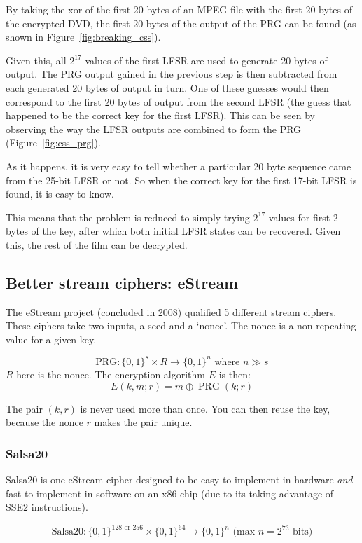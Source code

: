 \documentclass[10pt,a4paper]{report}
\begin{document}
By taking the xor of the first 20 bytes of an MPEG file with the first 20 bytes of the encrypted
DVD, the first 20 bytes of the output of the PRG can be found (as shown in
Figure~\ref{fig:breaking_css}).

Given this, all $2^{17}$ values of the first LFSR are used to generate 20 bytes of output.
The PRG output gained in the previous step is then subtracted from each generated 20 bytes of
output in turn. One of these guesses would then correspond to the first 20 bytes of output from the
second LFSR (the guess that happened to be the correct key for the first LFSR). This can be seen by
observing the way the LFSR outputs are combined to form the PRG (Figure~\ref{fig:css_prg}).

As it happens, it is very easy to tell whether a particular 20 byte sequence came from the 25-bit
LFSR or not. So when the correct key for the first 17-bit LFSR is found, it is easy to know.

This means that the problem is reduced to simply trying $2^{17}$ values for first 2 bytes of the
key, after which both initial LFSR states can be recovered. Given this, the rest of the film can be
decrypted.

\subsection{Better stream ciphers: eStream}

The eStream project (concluded in 2008) qualified 5 different stream ciphers. These ciphers take
two inputs, a seed and a `nonce'. The nonce is a non-repeating value for a given key.

    $$ \text{PRG} \colon \{0, 1\}^s \times R \to \{0, 1\}^n \text{ where } n \gg s $$
$R$ here is the nonce. The encryption algorithm $E$ is then:
    $$ E(k, m; r) = m \oplus \operatorname{PRG}(k; r) $$

The pair $(k, r)$ is never used more than once. You can then reuse the key, because the nonce $r$
makes the pair unique.

\subsubsection*{Salsa20}

Salsa20 is one eStream cipher designed to be easy to implement in hardware \textit{and} fast to
implement in software on an x86 chip (due to its taking advantage of SSE2 instructions).

    $$ \text{Salsa20} \colon \{0, 1\}^{128 \text{ or } 256} \times \{0, 1\}^{64} \to \{0, 1\}^n
       \text{ (max } n = 2^{73} \text{ bits)}$$
\end{document}
